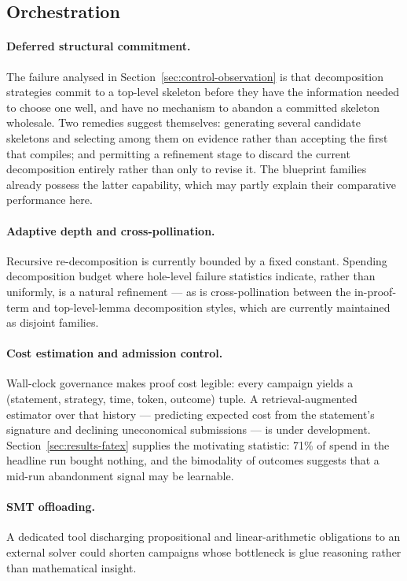 \documentclass[12pt, a4paper]{article}
\begin{document}
\subsection{Orchestration}

\paragraph{Deferred structural commitment.} The failure analysed in
Section~\ref{sec:control-observation} is that decomposition strategies
commit to a top-level skeleton before they have the information needed to
choose one well, and have no mechanism to abandon a committed skeleton
wholesale. Two remedies suggest themselves: generating several candidate
skeletons and selecting among them on evidence rather than accepting the
first that compiles; and permitting a refinement stage to discard the
current decomposition entirely rather than only to revise it. The blueprint
families already possess the latter capability, which may partly explain
their comparative performance here.

\paragraph{Adaptive depth and cross-pollination.} Recursive
re-decomposition is currently bounded by a fixed constant. Spending
decomposition budget where hole-level failure statistics indicate, rather
than uniformly, is a natural refinement --- as is cross-pollination between
the in-proof-term and top-level-lemma decomposition styles, which are
currently maintained as disjoint families.

\paragraph{Cost estimation and admission control.} Wall-clock governance
makes proof cost legible: every campaign yields a
(statement, strategy, time, token, outcome) tuple. A retrieval-augmented
estimator over that history --- predicting expected cost from the statement's
signature and declining uneconomical submissions --- is under development.
Section~\ref{sec:results-fatex} supplies the motivating statistic: 71\% of
spend in the headline run bought nothing, and the bimodality of outcomes
suggests that a mid-run abandonment signal may be learnable.

\paragraph{SMT offloading.} A dedicated tool discharging propositional and
linear-arithmetic obligations to an external solver could shorten campaigns
whose bottleneck is glue reasoning rather than mathematical insight.
\end{document}
